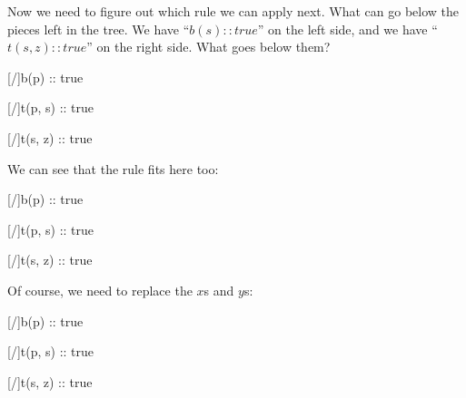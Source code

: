 \documentclass[../../../main.tex]{subfiles}
\begin{document}
\noindent
Now we need to figure out which rule we can apply next. What can go below the pieces left in the tree. We have ``$b(s) :: true$'' on the left side, and we have ``$t(s, z) :: true$'' on the right side. What goes below them?

\begin{prooftree*}
  \hypo{}
  [\startrule/]{b(p) :: true}

  \hypo{}
  [\startrule/]{t(p, s) :: true}


  \ellipsis{}{}
    
  \hypo{}
  [\startrule/]{t(s, z) :: true}
  \ellipsis{}{}

  
\end{prooftree*}

\noindent
We can see that the  rule fits here too:

\begin{prooftree*}
  \hypo{}
  [\startrule/]{b(p) :: true}
  
  \hypo{}
  [\startrule/]{t(p, s) :: true}

    
  \hypo{}
  [\startrule/]{t(s, z) :: true}

  
\end{prooftree*}

\noindent
Of course, we need to replace the $x$s and $y$s:

\begin{prooftree*}
  \hypo{}
  [\startrule/]{b(p) :: true}
  
  \hypo{}
  [\startrule/]{t(p, s) :: true}

    
  \hypo{}
  [\startrule/]{t(s, z) :: true}

  
\end{prooftree*}
\end{document}
